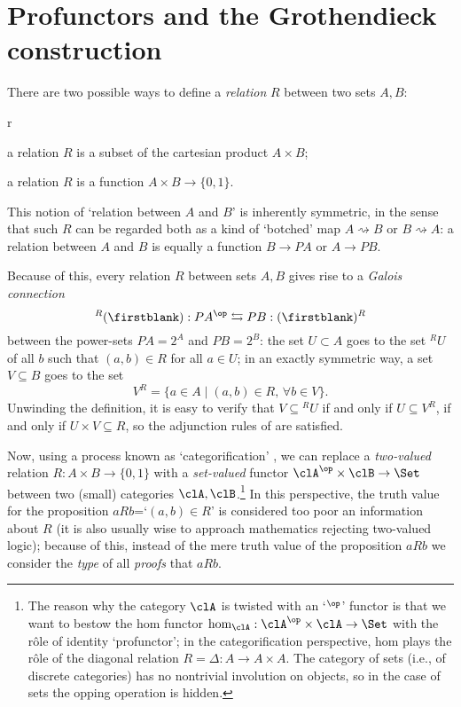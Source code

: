 \section{Profunctors and the Gro\-then\-dieck construction}\label{sec_2_profu}
\label{sec:org7dd09e1}
There are two possible ways to define a \emph{relation} $R$ between two sets $A,B$:
\begin{enumtag}{r}
	\item \label{r_1} a relation $R$ is a subset of the cartesian product $A\times B$;
	\item \label{r_2} a relation $R$ is a function $A\times B \to \{0,1\}$.
\end{enumtag}
This notion of `relation between $A$ and $B$' is inherently symmetric, in the sense that such $R$ can be regarded both as a kind of `botched' map $A \rightsquigarrow B$ or $B\rightsquigarrow A$: a relation between $A$ and $B$ is equally a function $B\to PA$ or $A\to PB$.

Because of this, every relation $R$ between sets $A,B$ gives rise to a \emph{Galois connection}
\[{}^R(\firstblank) :PA^\op \leftrightarrows PB : (\firstblank)^R \label{adjunzia} \]
between the power-sets $PA=2^A$ and $PB = 2^B$: the set $U\subset A$ goes to the set ${}^RU$ of all $b$ such that $(a,b)\in R$ for all $a\in U$; in an exactly symmetric way, a set $V\subseteq B$ goes to the set
\[V^R = \{a\in A\mid (a,b) \in R,\, \forall b\in V\}.\]
Unwinding the definition, it is easy to verify that $V\subseteq{}^RU$ if and only if $U\subseteq V^R$, if and only if $U\times V\subseteq R$, so the adjunction rules of \cite[??]{??} are satisfied.

Now, using a process known as `categorification' \cite{baez1998categorification}, we can replace a \emph{two-valued} relation $R : A\times B \to \{0,1\}$ with a \emph{set-valued} functor $\clA^\op\times\clB \to \Set$ between two (small) categories $\clA,\clB$.\footnote{The reason why the category $\clA$ is twisted with an `$^\op$' functor is that we want to bestow the hom functor $\hom_{\clA} : \clA^\op\times\clA \to \Set$ with the r\^ole of identity `profunctor'; in the categorification perspective, hom plays the r\^ole of the diagonal relation $R=\Delta : A\to A\times A$. The category of sets (i.e., of discrete categories) has no nontrivial involution on objects, so in the case of sets the opping operation is hidden.} In this perspective, the truth value for the proposition $aRb$=`$(a,b) \in R$' is considered too poor an information about $R$ (it is also usually wise to approach mathematics rejecting two-valued logic); because of this, instead of the mere truth value of the proposition $aRb$ we consider the \emph{type} of all \emph{proofs} that $aRb$.

